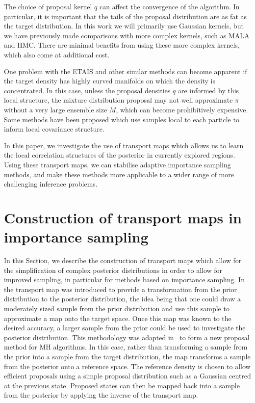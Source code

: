 \documentclass[final]{siamltex}
\newcommand{\edit}[1]{#1}
\begin{document}
\edit{The choice of proposal kernel $q$ can affect the convergence of
  the algorithm. In particular, it is important that the tails of the
  proposal distribution are as fat as the target distribution. In this
  work we will primarily use Gaussian kernels, but we have previously
  made comparisons with more complex kernels, such as MALA and HMC\cite{cotter2015parallel,russ2017parallel}. There are minimal
  benefits from using these more complex kernels, which also come at
  additional cost.}



One problem with the ETAIS and other similar methods can become apparent if
the target density has highly curved manifolds on which the density is
concentrated. In this
case, unless the proposal densities $q$ are informed by this local
structure, the mixture distribution proposal may not well approximate
$\pi$ without a very large ensemble size $M$, which can become
prohibitively expensive. Some methods have been
proposed\cite{douc2007minimum}
which use samples local to each particle to inform local covariance
structure.

\edit{In this paper, we investigate the use of transport maps which allows
us to learn the local correlation structures of the posterior in
currently explored regions. Using these transport maps, we can
stabilise adaptive importance sampling methods, and make these methods
more applicable to a wider range of more challenging inference problems.}

\section{Construction of transport maps in importance sampling} \label{sec:map}
In this Section, we describe the construction of transport maps which
allow for the simplification of complex posterior distributions in
order to allow for improved sampling, in particular for methods based
on importance sampling.
In~\cite{el2012bayesian} the transport map was introduced to provide a transformation from the prior
distribution to the posterior distribution, the idea being that one could draw a moderately sized
sample from the prior distribution and use this sample to approximate a map onto the target space.
Once this map was known to the desired accuracy, a larger sample from the prior could be used to
investigate the posterior distribution. This
methodology was adapted in~\cite{parno2018transport} to form a new proposal method for MH
algorithms. In this case, rather than transforming a sample from the prior into a sample from the target
distribution, the map transforms a sample from the posterior onto a reference space.
The reference density is chosen to allow efficient proposals using a simple proposal
distribution such as a Gaussian centred at the previous state. Proposed states can then be mapped back into a sample from the posterior by applying the inverse of the transport map.
\end{document}
